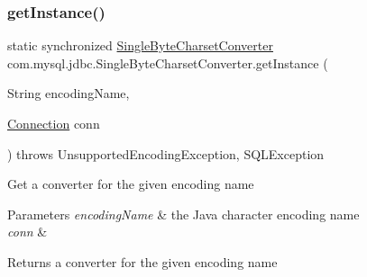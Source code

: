 \subsubsection{\texorpdfstring{get\+Instance()}{getInstance()}}
{\footnotesize\ttfamily static synchronized \mbox{\hyperlink{classcom_1_1mysql_1_1jdbc_1_1_single_byte_charset_converter}{Single\+Byte\+Charset\+Converter}} com.\+mysql.\+jdbc.\+Single\+Byte\+Charset\+Converter.\+get\+Instance (\begin{DoxyParamCaption}\item[{String}]{encoding\+Name,  }\item[{\mbox{\hyperlink{interfacecom_1_1mysql_1_1jdbc_1_1_connection}{Connection}}}]{conn }\end{DoxyParamCaption}) throws Unsupported\+Encoding\+Exception, S\+Q\+L\+Exception\hspace{0.3cm}{\ttfamily [static]}}

Get a converter for the given encoding name


\begin{DoxyParams}{Parameters}
{\em encoding\+Name} & the Java character encoding name \\
\hline
{\em conn} & \\
\hline
\end{DoxyParams}
\begin{DoxyReturn}{Returns}
a converter for the given encoding name 
\end{DoxyReturn}

